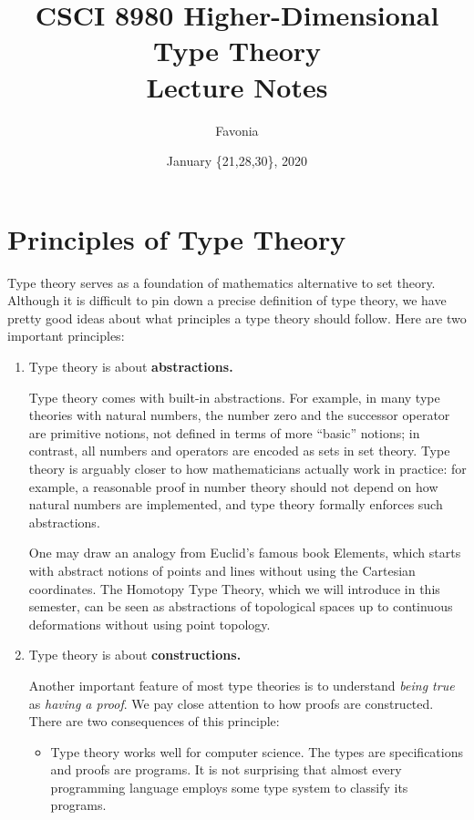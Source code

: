 \documentclass[11pt]{article}
\title{CSCI 8980 Higher-Dimensional Type Theory\\ Lecture Notes}
\author{Favonia}
\date{January \{21,28,30\}, 2020}
\begin{document}
\maketitle

\section{Principles of Type Theory}

Type theory serves as a foundation of mathematics alternative to set theory. Although it is difficult to pin down a precise definition of type theory, we have pretty good ideas about what principles a type theory should follow. Here are two important principles:
\begin{enumerate}
  \item Type theory is about \textbf{abstractions.}

    Type theory comes with built-in abstractions. For example, in many type theories with natural numbers, the number zero and the successor operator are primitive notions, not defined in terms of more ``basic'' notions; in contrast, all numbers and operators are encoded as sets in set theory. Type theory is arguably closer to how mathematicians actually work in practice: for example, a reasonable proof in number theory should not depend on how natural numbers are implemented, and type theory formally enforces such abstractions.

    One may draw an analogy from Euclid's famous book Elements, which starts with abstract notions of points and lines without using the Cartesian coordinates. The Homotopy Type Theory, which we will introduce in this semester, can be seen as abstractions of topological spaces up to continuous deformations without using point topology.

  \item Type theory is about \textbf{constructions.}

    Another important feature of most type theories is to understand \emph{being true} as \emph{having a proof}. We pay close attention to how proofs are constructed. There are two consequences of this principle:
    \begin{itemize}
      \item Type theory works well for computer science. The types are specifications and proofs are programs. It is not surprising that almost every programming language employs some type system to classify its programs.


\end{itemize}
\end{enumerate}
\end{document}
